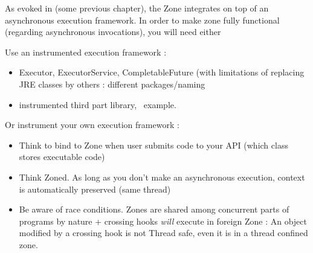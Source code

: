 As evoked in (some previous chapter), the Zone integrates on top of an asynchronous execution framework. In order to make zone fully functional (regarding asynchronous invocations), you will need either

Use an instrumented execution framework :
\begin{itemize}
\item Executor, ExecutorService, CompletableFuture (with limitations of replacing JRE classes by others : different packages/naming
\item instrumented third part library, \vertx\ example.
\end{itemize}

Or instrument your own execution framework :
\begin{itemize}
\item Think to bind to Zone when user submits code to your API (which class stores executable code)
\item Think Zoned. As long as you don't make an asynchronous execution, context is automatically preserved (same thread)
\item Be aware of race conditions. Zones are shared among concurrent parts of programs by nature + crossing hooks \emph{will} execute in foreign Zone : An object modified by a crossing hook is not Thread safe, even it is in a thread confined zone.
\end{itemize}